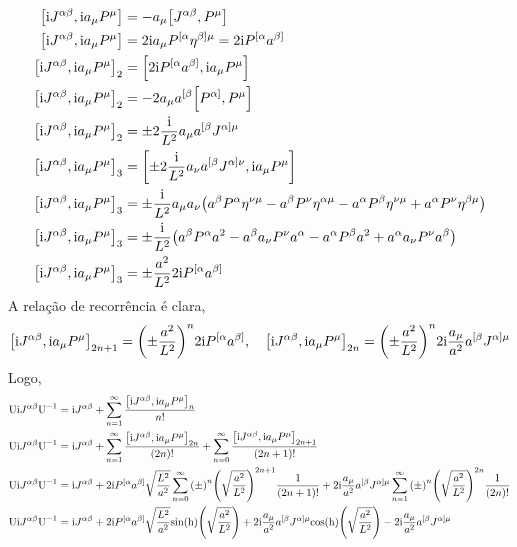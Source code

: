 \begin{align*}
    \comm{\im J^{\alpha\beta}}{\im a_\mu P^\mu}&=-a_\mu\comm{J^{\alpha\beta}}{P^\mu}\\
    \comm{\im J^{\alpha\beta}}{\im a_\mu P^\mu}&=2\im a_\mu P^{[\alpha}\eta^{\beta]\mu}=2\im P^{[\alpha}a^{\beta]}\\
    \comm{\im J^{\alpha\beta}}{\im a_\mu P^\mu}_2&=\comm{2\im P^{[\alpha}a^{\beta]}}{\im a_\mu P^\mu}\\
    \comm{\im J^{\alpha\beta}}{\im a_\mu P^\mu}_2&=-2 a_\mu a^{[\beta}\comm{ P^{\alpha]}}{ P^\mu}\\
    \comm{\im J^{\alpha\beta}}{\im a_\mu P^\mu}_2&=\pm2\frac{\im}{L^2} a_\mu a^{[\beta}J^{\alpha]\mu}\\
    \comm{\im J^{\alpha\beta}}{\im a_\mu P^\mu}_3&=\comm{\pm2\frac{\im}{L^2} a_\nu a^{[\beta}J^{\alpha]\nu}}{\im a_\mu P^\mu}\\
    \comm{\im J^{\alpha\beta}}{\im a_\mu P^\mu}_3&=\pm\frac{\im}{L^2}a_\mu a_\nu\qty(a^\beta P^{\alpha}\eta^{\nu\mu}-a^\beta P^{\nu}\eta^{\alpha\mu}-a^\alpha P^{\beta}\eta^{\nu\mu}+a^\alpha P^{\nu}\eta^{\beta\mu})\\
    \comm{\im J^{\alpha\beta}}{\im a_\mu P^\mu}_3&=\pm\frac{\im}{L^2}\qty(a^\beta P^{\alpha}a^2-a^\beta a_\nu P^{\nu}a^{\alpha}-a^\alpha P^{\beta}a^2+a^\alpha a_\nu P^{\nu}a^{\beta})\\
    \comm{\im J^{\alpha\beta}}{\im a_\mu P^\mu}_3&=\pm\frac{a^2}{L^2}2\im P^{[\alpha}a^{\beta]} 
\end{align*}
A relação de recorrência é clara,
\[\comm{\im J^{\alpha\beta}}{\im a_\mu P^\mu}_{2n+1}=\qty(\pm\frac{a^2}{L^2})^n2\im P^{[\alpha}a^{\beta]},\ \ \ \comm{\im J^{\alpha\beta}}{\im a_\mu P^\mu}_{2n}=\qty(\pm\frac{a^2}{L^2})^{n}2\im \frac{a_\mu}{a^2} a^{[\beta}J^{\alpha]\mu}\]
Logo,
\begin{align*}
    \textnormal U\im J^{\alpha\beta}\textnormal U^{-1}&=\im J^{\alpha\beta}+\sum\limits_{n=1}^\infty \frac{\comm{\im J^{\alpha\beta}}{\im a_\mu P^\mu}_{n}}{n!}\\
    \textnormal U\im J^{\alpha\beta}\textnormal U^{-1}&=\im J^{\alpha\beta}+\sum\limits_{n=1}^\infty \frac{\comm{\im J^{\alpha\beta}}{\im a_\mu P^\mu}_{2n}}{(2n)!}+\sum\limits_{n=0}^\infty \frac{\comm{\im J^{\alpha\beta}}{\im a_\mu P^\mu}_{2n+1}}{(2n+1)!}\\
    \textnormal U\im J^{\alpha\beta}\textnormal U^{-1}&=\im J^{\alpha\beta}+2\im  P^{[\alpha}a^{\beta]}\sqrt{\frac{L^2}{a^2}}\sum\limits_{n=0}^\infty\qty(\pm)^n\qty(\sqrt{\frac{a^2}{L^2}})^{2n+1} \frac{1}{(2n+1)!}+2\im \frac{a_\mu}{a^2} a^{[\beta}J^{\alpha]\mu}\sum\limits_{n=1}^\infty\qty(\pm)^n\qty(\sqrt{\frac{a^2}{L^2}})^{2n} \frac{1}{(2n)!}\\
    \textnormal U\im J^{\alpha\beta}\textnormal U^{-1}&=\im J^{\alpha\beta}+2\im  P^{[\alpha}a^{\beta]}\sqrt{\frac{L^2}{a^2}}\textnormal{sin(h)}\qty(\sqrt{\frac{a^2}{L^2}})+2\im \frac{a_\mu}{a^2} a^{[\beta}J^{\alpha]\mu}\textnormal{cos(h)}\qty(\sqrt{\frac{a^2}{L^2}})-2\im \frac{a_\mu}{a^2} a^{[\beta}J^{\alpha]\mu}
\end{align*}
